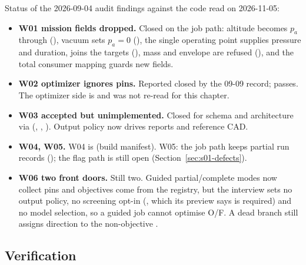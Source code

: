 Status of the 2026-09-04 audit findings against the code read on 2026-11-05:
\begin{itemize}
  \item \textbf{W01 mission fields dropped.} Closed on the job path: altitude becomes $p_a$ through  (), vacuum sets $p_a = 0$ (), the single operating point supplies pressure and duration,  joins the targets (), mass and envelope are refused (), and the total consumer mapping guards new fields.
  \item \textbf{W02 optimizer ignores pins.} Reported closed by the 09-09 record;  passes. The optimizer side is  and was not re-read for this chapter.
  \item \textbf{W03 accepted but unimplemented.} Closed for schema and architecture via  (, , ). Output policy now drives reports and reference CAD.
  \item \textbf{W04, W05.} W04 is  (build manifest). W05: the job path keeps partial run records (); the flag path is still open (Section~\ref{sec:s01-defects}).
  \item \textbf{W06 two front doors.} Still two. Guided partial/complete modes now collect pins and objectives come from the registry, but the interview sets no output policy, no screening opt-in (, which its preview says is required) and no model selection, so a guided job cannot optimise O/F. A dead branch still assigns direction  to the non-objective .
\end{itemize}

\subsection{Verification}\label{sec:s02-tests}

